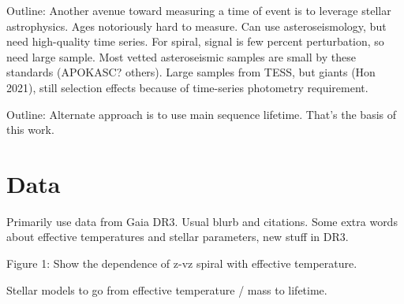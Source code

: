 Outline: Another avenue toward measuring a time of event is to leverage stellar astrophysics. Ages notoriously hard to measure. Can use asteroseismology, but need high-quality time series. For spiral, signal is few percent perturbation, so need large sample. Most vetted asteroseismic samples are small by these standards (APOKASC? others). Large samples from TESS, but giants (Hon 2021), still selection effects because of time-series photometry requirement.

Outline: Alternate approach is to use main sequence lifetime. That's the basis of this work.


\section{Data} \label{sec:data}

Primarily use data from Gaia DR3. Usual blurb and citations. Some extra words about effective temperatures and stellar parameters, new stuff in DR3.

Figure 1: Show the dependence of z-vz spiral with effective temperature.


Stellar models to go from effective temperature / mass to lifetime.


